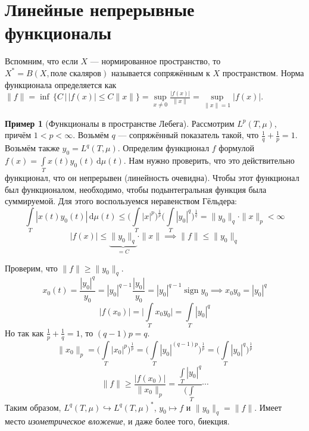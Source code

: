 \documentclass[11pt,openany,a4paper]{scrartcl}
\theoremstyle{plain}
\theoremstyle{definition}
\newtheorem{example}[theorem]{Пример}
\newcommand{\dif}{\, \mathrm d}
\DeclareMathOperator{\sign}{sign}
\begin{document}
\section{Линейные непрерывные функционалы}

Вспомним, что если $X$ — нормированное пространство, то
$X^\ast = B(X, \text{поле скаляров})$ называется сопряжённым к $X$ пространством.
Норма функционала определяется как $\|f\| = \inf\,\{C\,\big|\,|f(x)|
\leqslant C\|x\|\} =
\sup\limits_{x \neq 0}\frac{|f(x)|}{\|x\|} = \sup\limits_{\|x\|=1} |f(x)|$.

\begin{example}[Функционалы в пространстве Лебега]
        Рассмотрим $L^p(T, \mu)$, причём
        $1 < p < \infty$. Возьмём $q$ — сопряжённый показатель такой, что
        $\frac{1}{q} + \frac{1}{p} = 1$. Возьмём также $y_0 = L^q(T, \mu)$.
        Определим функционал $f$ формулой
        $f(x) = \int\limits_T x(t)y_0(t)\dif \mu(t)$. Нам нужно проверить, что
        это действительно функционал, что он непрерывен (линейность очевидна).
        Чтобы этот функционал был функционалом, необходимо, чтобы
        подынтегральная функция была суммируемой. Для этого воспользуемся
        неравенством Гёльдера:
        $$
        \int\limits_T |x(t)y_0(t)| \dif \mu(t) \leqslant
        \bigg(\int\limits_T |x|^p\bigg)^\frac{1}{p}
        \bigg(\int\limits_T |y_0|^q\bigg)^\frac{1}{q} = \|y_0\|_q\cdot \|x\|_p <
        \infty
        $$
        $$
        |f(x)| \leqslant \underbrace{\|y_0\|_q}_{=C} \cdot \|x\|
        \implies \|f\| \leqslant \|y_0\|_q
        $$
        
        Проверим, что $\|f\| \geqslant \|y_0\|_q$.
        $$
        x_0(t) = \frac{|y_0|^q}{y_0} = |y_0|^{q-1} \frac{|y_0|}{y_0} =
        |y_0|^{q-1}\sign y_0
        \implies x_0y_0 = |y_0|^q
        $$
        $$
        |f(x_0)| = \bigg|\int\limits_T x_0y_0\bigg| = \int\limits_T|y_0|^q
        $$
        Но так как $\frac{1}{p} + \frac{1}{q} = 1$, то $(q-1)p = q$.
        $$
        \|x_0\|_p = \bigg(\int\limits_T |x_0|^p\bigg)^\frac{1}{p} =
        \bigg(\int\limits_T |y_0|^{(q-1)p}\bigg)^\frac{1}{p} =
        \bigg(\int\limits_T |y_0|^q\bigg)^\frac{1}{p}
        $$
        $$
        \|f\|\geqslant \frac{|f(x_0)|}{\|x_0\|_p} =
        \frac{\int\limits_T |y_0|^q}{\bigg(\int\limits_T} \cdots
        $$
        Таким образом, $L^q(T, \mu) \hookrightarrow L^q(T, \mu)^\ast$,
        $y_0 \mapsto f$ и $\|y_0\|_q = \|f\|$. Имеет место
        \emph{изометрическое вложение}, и даже более того, биекция.
\end{example}
\end{document}

